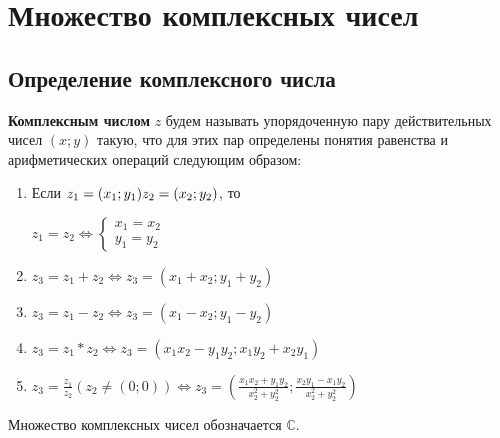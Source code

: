 \documentclass[a4paper,oneside]{article}
\newcommand{\parspace}{\vspace{10pt}}
\begin{document}
\section{Множество комплексных чисел}

\subsection{Определение комплексного числа}

\textbf{Комплексным числом} $z$ будем называть упорядоченную пару действительных
чисел $(x;y)$ такую, что для этих пар определены понятия равенства и арифметических
операций следующим образом:

\begin{enumerate}
    \item Если $\\ z_1 = (x_1;y_1) \\ z_2 = (x_2;y_2)$, то
    
    $z_1 = z_2 \Leftrightarrow \begin{cases}
        x_1 = x_2 \\
        y_1 = y_2
    \end{cases}$

    \item $z_3 = z_1 + z_2 \Leftrightarrow z_3 = (x_1 + x_2; y_1 + y_2)$
    \item $z_3 = z_1 - z_2 \Leftrightarrow z_3 = (x_1 - x_2; y_1 - y_2)$
    \item $z_3 = z_1 * z_2 \Leftrightarrow z_3 = (x_1 x_2 - y_1 y_2; x_1 y_2 + x_2 y_1)$
    \item $z_3 = \frac{z_1}{z_2} (z_2 \neq (0; 0)) \Leftrightarrow 
    z_3 = (\frac{x_1 x_2 + y_1 y_2}{x_2^2 + y_2^2}; \frac{x_2 y_1 - x_1 y_2}{x_2^2 + y_2^2})$
\end{enumerate}

Множество комплексных чисел обозначается $\mathbb{C}$.

\parspace
\end{document}
